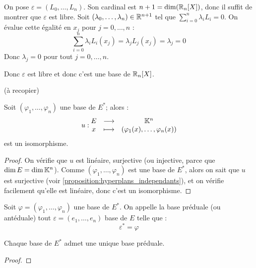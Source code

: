\documentclass[11pt,a4paper]{report}
\begin{document}
\begin{correction}
    On pose $\varepsilon = (L_0,\dots,L_n)$. Son cardinal est $n+1 = \dim(\mathbb{R}_n[X])$, donc il suffit de montrer que $\varepsilon$ est libre. Soit $(\lambda_0,\dots,\lambda_n) \in \mathbb{R}^{n+1}$ tel que $\sum_{i=0}^n \lambda_i L_i = 0$. On évalue cette égalité en $x_j$ pour $j=0,\dots,n$ :
    $$\sum_{i=0}^n \lambda_i L_i(x_j) = \lambda_j L_j(x_j) = \lambda_j = 0$$
    Donc $\lambda_j = 0$ pour tout $j=0,\dots,n$.

    Donc $\varepsilon$ est libre et donc c'est une base de $\mathbb{R}_n[X]$.

    (à recopier)
\end{correction}
\todo

\begin{proposition}
    Soit $(\varphi_1,\dots,\varphi_n)$ une base de $E^*$; alors :
    $$u : \begin{matrix} E & \longrightarrow & \mathbb{K}^n \\ x & \longmapsto & (\varphi_1(x),\dots,\varphi_n(x)) \end{matrix}$$
    est un isomorphisme.
\end{proposition}

\begin{proof}
    On vérifie que $u$ est linéaire, surjective (ou injective, parce que $\dim E = \dim \mathbb{K}^n$). Comme $(\varphi_1,\dots,\varphi_n)$ est une base de $E^*$, alors on sait que $u$ est surjective (voir \ref{proposition:hyperplans_independants}), et on vérifie facilement qu'elle est linéaire, donc c'est un isomorphisme.
\end{proof}

\begin{definition}
    Soit $\varphi = (\varphi_1,\dots,\varphi_n)$ une base de $E^*$. On appelle la base préduale (ou antéduale) tout $\varepsilon = (e_1,\dots,e_n)$ base de $E$ telle que :
    $$\varepsilon^* = \varphi$$
\end{definition}

\begin{proposition}
    Chaque base de $E^*$ admet une unique base préduale.
\end{proposition}

\begin{proof}
\end{proof}
\todo
\end{document}
